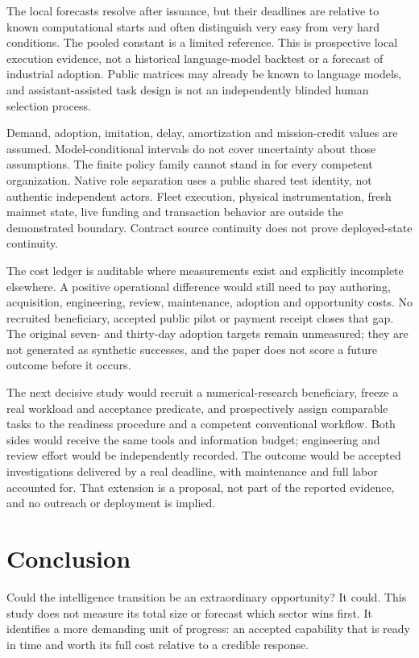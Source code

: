 \documentclass[11pt,a4paper]{article}
\begin{document}
The local forecasts resolve after issuance, but their deadlines are relative to known computational starts and often distinguish very easy from very hard conditions. The pooled constant is a limited reference. This is prospective local execution evidence, not a historical language-model backtest or a forecast of industrial adoption. Public matrices may already be known to language models, and assistant-assisted task design is not an independently blinded human selection process.

Demand, adoption, imitation, delay, amortization and mission-credit values are assumed. Model-conditional intervals do not cover uncertainty about those assumptions. The finite policy family cannot stand in for every competent organization. Native role separation uses a public shared test identity, not authentic independent actors. Fleet execution, physical instrumentation, fresh mainnet state, live funding and transaction behavior are outside the demonstrated boundary. Contract source continuity does not prove deployed-state continuity.

The cost ledger is auditable where measurements exist and explicitly incomplete elsewhere. A positive operational difference would still need to pay authoring, acquisition, engineering, review, maintenance, adoption and opportunity costs. No recruited beneficiary, accepted public pilot or payment receipt closes that gap. The original seven- and thirty-day adoption targets remain unmeasured; they are not generated as synthetic successes, and the paper does not score a future outcome before it occurs.

The next decisive study would recruit a numerical-research beneficiary, freeze a real workload and acceptance predicate, and prospectively assign comparable tasks to the readiness procedure and a competent conventional workflow. Both sides would receive the same tools and information budget; engineering and review effort would be independently recorded. The outcome would be accepted investigations delivered by a real deadline, with maintenance and full labor accounted for. That extension is a proposal, not part of the reported evidence, and no outreach or deployment is implied.

\section{Conclusion}
Could the intelligence transition be an extraordinary opportunity? It could. This study does not measure its total size or forecast which sector wins first. It identifies a more demanding unit of progress: an accepted capability that is ready in time and worth its full cost relative to a credible response.
\end{document}
